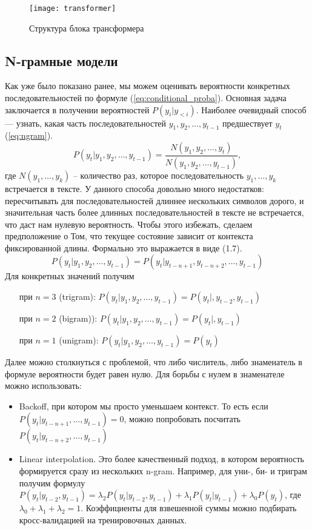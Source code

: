 \begin{figure}[ht]
	\centering
	\texttt{[image: transformer]}  
	\caption{ Структура блока трансформера}
	\label{fig:transformer}
\end{figure}

\subsection{N-грамные модели}
\label{sub:domain:n_gram}

Как уже было показано ранее, мы можем оценивать вероятности конкретных последовательностей по формуле (\ref{eq:conditional_proba}). Основная задача заключается в получении вероятностей $P(y_i|y_{<i})$. Наиболее очевидный способ --- узнать, какая часть последовательностей $y_1, y_2,\dots, y_{t-1}$ предшествует $y_t$ (\ref{eq:ngram}).
\begin{equation}
	P(y_t|y_1,y_2,\dots,y_{t-1}) = \frac{N(y_1,y_2,\dots,y_t)}{N(y_1,y_2,\dots,y_{t-1})},
	\label{eq:ngram}
\end{equation} где $N(y_1,\dots,y_k)$ -- количество раз, которое последовательность $y_1,\dots,y_k$ встречается в тексте. У данного способа довольно много недостатков: пересчитывать для последовательностей длиннее нескольких символов дорого, и значительная часть более длинных последовательностей в тексте не встречается, что даст нам нулевую вероятность. Чтобы этого избежать, сделаем предположение о Том, что текущее состояние зависит от контекста фиксированной длины. Формально это выражается в виде (1.7).
\begin{equation}
	P(y_t|y_1,y_2,\dots,y_{t-1}) = P(y_t|y_{t-n+1}, y_{t-n+2},\dots,y_{t-1})
\end{equation}
Для конкретных значений получим
\begin{itemize}
	\item[при] $n = 3$ (trigram): $P(y_t|y_1,y_2,\dots,y_{t-1}) = P(y_t|, y_{t-2},y_{t-1})$
	\item[при] $n = 2$ (bigram)): $P(y_t|y_1,y_2,\dots,y_{t-1}) = P(y_t|, y_{t-1})$
	\item[при] $n = 1$ (unigram): $P(y_t|y_1,y_2,\dots,y_{t-1}) = P(y_t)$
\end{itemize}

Далее можно столкнуться с проблемой, что либо числитель, либо знаменатель в формуле вероятности будет равен нулю. Для борьбы с нулем в знаменателе можно использовать:

\begin{itemize}
	\item Backoff, при котором мы просто уменьшаем контекст. То есть если $P(y_t|y_{t-n+1},\dots,y_{t-1}) = 0$, можно попробовать посчитать $P(y_t|y_{t-n+2},\dots,y_{t-1})$
	\item Linear interpolation. Это более качественный подход, в котором вероятность формируется сразу из нескольких n-gram. Например, для уни-, би- и триграм получим формулу $P(y_t|y_{t-2}, y_{t-1}) = \lambda_2P(y_t|y_{t-2}, y_{t-1}) + \lambda_1P(y_t|y_{t-1}) + \lambda_0P(y_t)$, где $\lambda_0 + \lambda_1 + \lambda_2 = 1$. Коэффициенты для взвешенной суммы можно подбирать кросс-валидацией на тренировочных данных.
\end{itemize}

